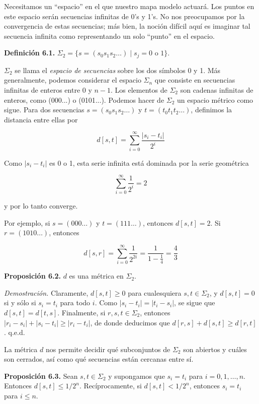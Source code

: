 \documentclass[10pt,a4paper]{book}
\begin{document}
\bigskip

Necesitamos un “espacio” en el que nuestro mapa modelo actuará. Los puntos en este espacio serán secuencias infinitas de 0's y 1's. No nos preocupamos por la convergencia de estas secuencias; más bien, la noción difícil aquí es imaginar tal secuencia infinita como representando un solo “punto” en el espacio.

\bigskip

\textbf{Definición 6.1.} $\Sigma_2 = \{s = (s_0 s_1 s_2 \ldots) \mid s_j = 0 \text{ o } 1\}$.

$\Sigma_2$ se llama el \textit{espacio de secuencias} sobre los dos símbolos 0 y 1. Más generalmente, podemos considerar el espacio $\Sigma_n$ que consiste en secuencias infinitas de enteros entre 0 y $n - 1$. Los elementos de $\Sigma_2$ son cadenas infinitas de enteros, como (000...) o (0101...). Podemos hacer de $\Sigma_2$ un espacio métrico como sigue. Para dos secuencias $s = (s_0 s_1 s_2 \ldots)$ y $t = (t_0 t_1 t_2 \ldots)$, definimos la distancia entre ellas por

\[
d[s,t] = \sum_{i=0}^{\infty} \frac{|s_i - t_i|}{2^i}
\]

Como $|s_i - t_i|$ es 0 o 1, esta serie infinita está dominada por la serie geométrica

\[
\sum_{i=0}^{\infty} \frac{1}{2^i} = 2
\]

y por lo tanto converge.

Por ejemplo, si $s = (000\ldots)$ y $t = (111\ldots)$, entonces $d[s,t] = 2$. Si $r = (1010\ldots)$, entonces

\[
d[s,r] = \sum_{i=0}^{\infty} \frac{1}{2^{2i}} = \frac{1}{1 - \frac{1}{4}} = \frac{4}{3}
\]

\textbf{Proposición 6.2.} $d$ es una métrica en $\Sigma_2$.

\textit{Demostración.} Claramente, $d[s,t] \geq 0$ para cualesquiera $s,t \in \Sigma_2$, y $d[s,t] = 0$ si y sólo si $s_i = t_i$ para todo $i$. Como $|s_i - t_i| = |t_i - s_i|$, se sigue que $d[s,t] = d[t,s]$. Finalmente, si $r,s,t \in \Sigma_2$, entonces $|r_i - s_i| + |s_i - t_i| \geq |r_i - t_i|$, de donde deducimos que $d[r,s] + d[s,t] \geq d[r,t]$. \hfill q.e.d.

La métrica $d$ nos permite decidir qué subconjuntos de $\Sigma_2$ son abiertos y cuáles son cerrados, así como qué secuencias están cercanas entre sí.

\textbf{Proposición 6.3.} Sean $s, t \in \Sigma_2$ y supongamos que $s_i = t_i$ para $i = 0,1,\ldots,n$. Entonces $d[s,t] \leq 1/2^n$. Recíprocamente, si $d[s,t] < 1/2^n$, entonces $s_i = t_i$ para $i \leq n$.
\end{document}
